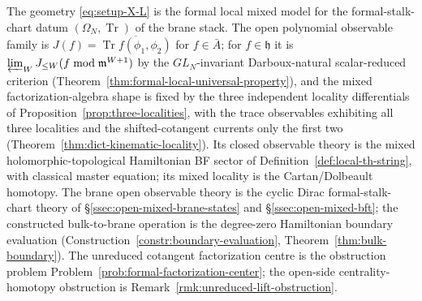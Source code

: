 \documentclass[11pt]{memoir}
\begin{document}
\begin{prop}\label{prop:local-model-mixed-definition}
  The geometry \eqref{eq:setup-X-L} is the formal local mixed model
  for the formal-stalk-chart datum
  \((\Omega_N,\operatorname{Tr})\) of the brane stack.  The open
	  polynomial observable family is
	  \(J(f)=\overline{\operatorname{Tr}f(\phi_1,\phi_2)}\) for
	  \(f\in\bar A\); for \(f\in\mathfrak h\) it is
	  \(\varprojlim_WJ_{\leq W}(f\bmod\mathfrak m^{W+1})\) by the
  \(GL_N\)-invariant Darboux-natural scalar-reduced criterion
  (Theorem~\ref{thm:formal-local-universal-property}), and the mixed
  factorization-algebra shape is fixed by the three independent
  locality differentials of
  Proposition~\ref{prop:three-localities}, with the trace observables
  exhibiting all three localities and the shifted-cotangent currents
  only the first two
  (Theorem~\ref{thm:dict-kinematic-locality}). Its closed
  observable theory is the mixed holomorphic-topological Hamiltonian
  BF sector of Definition~\ref{def:local-th-string}, with classical
  master equation; its mixed locality is the Cartan/Dolbeault
  homotopy. The brane open observable theory is the cyclic Dirac
  formal-stalk-chart theory of \S\ref{ssec:open-mixed-brane-states} and
  \S\ref{ssec:open-mixed-bft}; the constructed bulk-to-brane operation
  is the degree-zero Hamiltonian boundary evaluation
  (Construction~\ref{constr:boundary-evaluation},
  Theorem~\ref{thm:bulk-boundary}). The unreduced cotangent
  factorization centre is the obstruction problem
  Problem~\ref{prob:formal-factorization-center}; the open-side
  centrality-homotopy obstruction is
  Remark~\ref{rmk:unreduced-lift-obstruction}.
\end{prop}
\end{document}
